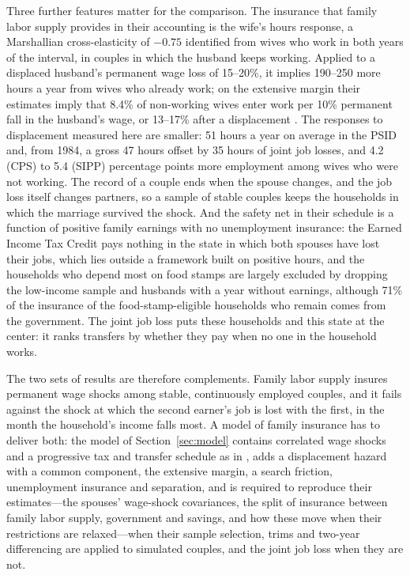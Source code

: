 Three further features matter for the comparison. The insurance that family labor supply provides in their accounting
is the wife's hours response, a Marshallian cross-elasticity of $-0.75$ identified from wives who work in both years of
the interval, in couples in which the husband keeps working. Applied to a displaced husband's permanent wage loss of
15--20\%, it implies 190--250 more hours a year from wives who already work; on the extensive margin their estimates imply
that 8.4\% of non-working wives enter work per 10\% permanent fall in the husband's wage, or 13--17\% after a displacement
\citep[p.~428]{blundell2016consumption}. The responses to displacement measured here are smaller: 51 hours a year on
average in the PSID and, from 1984, a gross 47 hours offset by 35 hours of joint job losses, and 4.2 (CPS) to 5.4 (SIPP)
percentage points more employment among wives who were not working. The record of a couple ends when the spouse
changes, and the job loss itself changes partners, so a sample of stable couples keeps the households in which the
marriage survived the shock. And the safety net in their schedule is a function of positive family earnings with no
unemployment insurance: the Earned Income Tax Credit pays nothing in the state in which both spouses have lost their
jobs, which lies outside a framework built on positive hours, and the households who depend most on food stamps are
largely excluded by dropping the low-income sample and husbands with a year without earnings, although 71\% of the
insurance of the food-stamp-eligible households who remain comes from the government. The joint job loss puts these
households and this state at the center: it ranks transfers by whether they pay when no one in the household works.

The two sets of results are therefore complements. Family labor supply insures permanent wage shocks among stable,
continuously employed couples, and it fails against the shock at which the second earner's job is lost with the first,
in the month the household's income falls most. A model of family insurance has to deliver both: the model of
Section~\ref{sec:model} contains correlated wage shocks and a progressive tax and transfer schedule as in
\citet{blundell2016consumption}, adds a displacement hazard with a common component, the extensive margin, a search
friction, unemployment insurance and separation, and is required to reproduce their estimates---the spouses' wage-shock
covariances, the split of insurance between family labor supply, government and savings, and how these move when their
restrictions are relaxed---when their sample selection, trims and two-year differencing are applied to simulated
couples, and the joint job loss when they are not.

